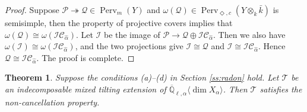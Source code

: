 \documentclass{amsart}
\theoremstyle{plain}
\newtheorem{theorem}[subsubsection]{Theorem}
\theoremstyle{definition}
\theoremstyle{remark}
\numberwithin{equation}{subsection}
\begin{document}
\begin{proof}
Suppose ${\mathcal{P}}\twoheadrightarrow{\mathcal{Q}}\in{\operatorname{Perv}_m({Y})}$ and $\omega({\mathcal{Q}})\in{\operatorname{Perv}_{\Diamond,c}({{{Y}}\otimes_k\bar{k}})}$ is semisimple, then the property of projective covers implies that $\omega({\mathcal{Q}})\cong\omega({\mathcal{IC}}_{\hat{\alpha}})$. Let ${\mathcal{I}}$ be the image of ${\mathcal{P}}\to{\mathcal{Q}}\oplus{\mathcal{IC}}_{\hat{\alpha}}$. Then we also have $\omega({\mathcal{I}})\cong\omega({\mathcal{IC}}_{\hat{\alpha}})$, and the two projections give ${\mathcal{I}}\cong{\mathcal{Q}}$ and ${\mathcal{I}}\cong{\mathcal{IC}}_{\hat{\alpha}}$. Hence ${\mathcal{Q}}\cong{\mathcal{IC}}_{\hat{\alpha}}$. The proof is complete.
\end{proof}

\begin{theorem}\label{th:tcan}
Suppose the conditions (a)--(d) in Section \ref{ss:radon} hold. Let ${\mathcal{T}}$ be an indecomposable mixed tilting extension of ${\overline{\mathbb{Q}}_{\ell,\alpha}{\langle{{\dim X_\alpha}}\rangle}}$. Then ${\mathcal{T}}$ satisfies the non-cancellation property.
\end{theorem}
\end{document}
